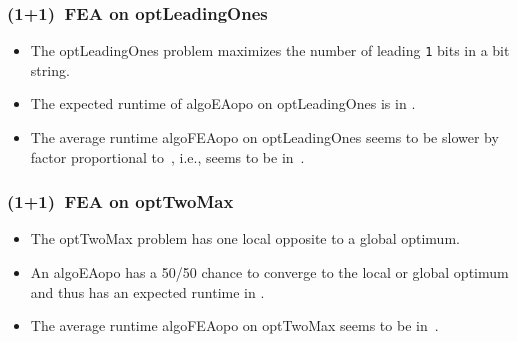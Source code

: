 \documentclass[aspectratio=169,mathserif,notheorems]{beamer}%
\begin{document}
%
\begin{frame}%
\frametitle{(1+1)~FEA on \gls{optLeadingOnes}}%
\parbox{0.37\paperwidth}{%
\begin{itemize}%
\item The \gls{optLeadingOnes} problem maximizes the number of leading \texttt{1} bits in a bit string\cite{W1989TGAASPWRBAORTIB,R1997CPOEA}.%
\item<2-> The expected runtime of \gls{algoEAopo} on \gls{optLeadingOnes} is in \cite{DJW2002OTAOTOPOEA}.%
\item<3-> The average runtime \gls{algoFEAopo} on \gls{optLeadingOnes} seems to be slower by factor proportional to~\scale, i.e., seems to be in~\cite{WWLC2021FFAMOAIUBTOTOFV}.%
\end{itemize}%
}%
%
%
%
\end{frame}%
%
\begin{frame}%
\frametitle{(1+1)~FEA on \gls{optTwoMax}}%
\parbox{0.37\paperwidth}{%
\begin{itemize}%
\item The \gls{optTwoMax} problem has one local opposite to a global optimum\cite{FQW2018ELDBOAWHTMO,VHGN2002FTTIMEAHSP,ZWWW2026WFFAFTSIFGLS}.%
\item<2-> An \gls{algoEAopo} has a 50/50 chance to converge to the local or global optimum and thus has an expected runtime in \bigThetab{\scale^{\scale}}.\cite{FQW2018ELDBOAWHTMO,FOSW2009AODPMFGE}%
\item<3-> The average runtime \gls{algoFEAopo} on \gls{optTwoMax} seems to be in~\bigOb{\scale^2 \ln{\scale}}\cite{WWLC2021FFAMOAIUBTOTOFV}.%
\end{itemize}%
}%
%
%
%
%
\end{frame}%
%
\end{document}
